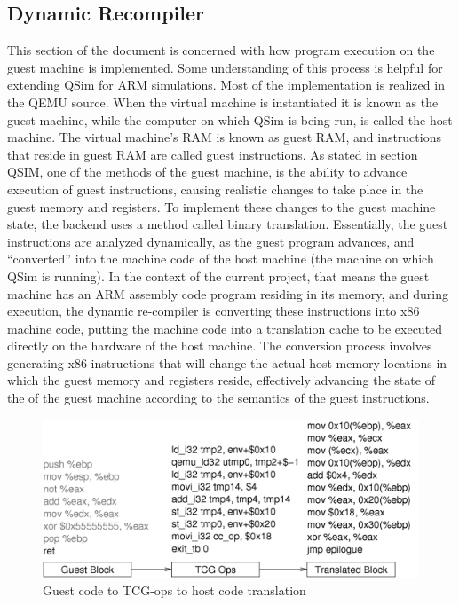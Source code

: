 \documentclass[letterpaper,10pt,twocolumn]{article}
\begin{document}
\subsection{Dynamic Recompiler}
This section of the document is concerned with how program execution on the guest machine is implemented. Some understanding of this process is helpful for extending QSim for ARM simulations. Most of the implementation is realized in the QEMU source. When the virtual machine is instantiated it is known as the guest machine, while the computer on which QSim is being run, is called the host machine. The virtual machine’s RAM is known as guest RAM, and instructions that reside in guest RAM are called guest instructions. As stated in section QSIM, one of the methods of the guest machine, is the ability to advance execution of guest instructions, causing realistic changes to take place in the guest memory and registers.
To implement these changes to the guest machine state, the backend uses a method called binary translation. Essentially, the guest instructions are analyzed dynamically, as the guest program advances, and “converted” into the machine code of the host machine (the machine on which QSim is running). In the context of the current project, that means the guest machine has an ARM assembly code program residing in its memory, and during execution, the dynamic re-compiler is converting these instructions into x86 machine code, putting the machine code into a translation cache to be executed directly on the hardware of the host machine. The conversion process involves generating x86 instructions that will change the actual host memory locations in which the guest memory and registers reside,  effectively advancing the state of the of the guest machine according to the semantics of the guest instructions.




\begin{figure}
\begin{center}
\includegraphics[width=6.5in]{return}
\caption{Guest code to TCG-ops to host code translation}
\label{fig:f2}
\end{center}
\end{figure}
\end{document}
